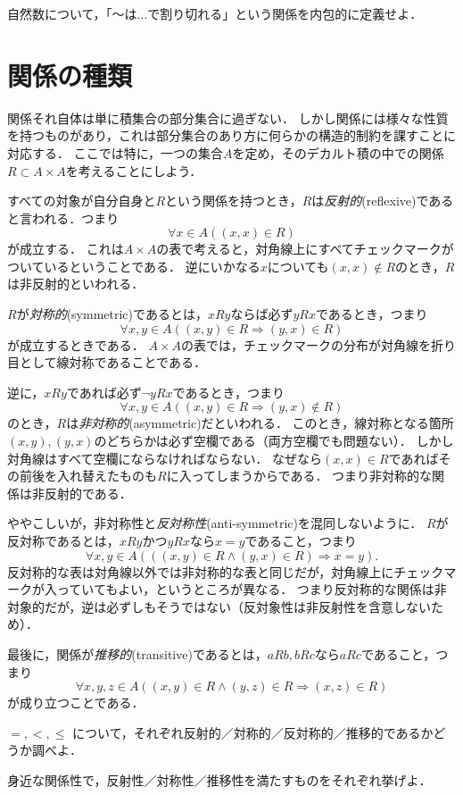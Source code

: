 \documentclass[11pt,a4paper]{jsarticle}
\begin{document}
\begin{exercise}
自然数について，「〜は...で割り切れる」という関係を内包的に定義せよ．
\end{exercise}


\section{関係の種類}
関係それ自体は単に積集合の部分集合に過ぎない．
しかし関係には様々な性質を持つものがあり，これは部分集合のあり方に何らかの構造的制約を課すことに対応する．
ここでは特に，一つの集合$A$を定め，そのデカルト積の中での関係$R \subset A \times A$を考えることにしよう．

すべての対象が自分自身と$R$という関係を持つとき，$R$は\emph{反射的}(reflexive)であると言われる．つまり
\[
 \forall x \in A ( (x,x) \in R )
\]
が成立する．
これは$A \times A$の表で考えると，対角線上にすべてチェックマークがついているということである．
逆にいかなる$x$についても$(x, x) \not\in R$のとき，$R$は非反射的といわれる．

$R$が\emph{対称的}(symmetric)であるとは，$xRy$ならば必ず$yRx$であるとき，つまり
\[
 \forall x, y \in A ( (x,y) \in R \Rightarrow (y,x) \in R)
\]
が成立するときである．
$A \times A$の表では，チェックマークの分布が対角線を折り目として線対称であることである．

逆に，$xRy$であれば必ず$\neg yRx$であるとき，つまり
\[
 \forall x, y \in A ( (x,y) \in R \Rightarrow (y,x) \not\in R)
\]
のとき，$R$は\emph{非対称的}(asymmetric)だといわれる．
このとき，線対称となる箇所$(x,y), (y,x)$のどちらかは必ず空欄である（両方空欄でも問題ない）．
しかし対角線はすべて空欄にならなければならない．
なぜなら$(x,x) \in R$であればその前後を入れ替えたものも$R$に入ってしまうからである．
つまり非対称的な関係は非反射的である．

ややこしいが，非対称性と\emph{反対称性}(anti-symmetric)を混同しないように．
$R$が反対称であるとは，$xRy$かつ$yRx$なら$x=y$であること，つまり
\[
 \forall x, y \in A ( ((x,y) \in R \wedge  (y,x) \in R) \Rightarrow x=y).
\]
反対称的な表は対角線以外では非対称的な表と同じだが，対角線上にチェックマークが入っていてもよい，というところが異なる．
つまり反対称的な関係は非対象的だが，逆は必ずしもそうではない（反対象性は非反射性を含意しないため）．

最後に，関係が\emph{推移的}(transitive)であるとは，$aRb, bRc$なら$aRc$であること，つまり
\[
 \forall x, y, z \in A ((x,y) \in R \wedge (y,z) \in R \Rightarrow (x,z) \in R)
\]
が成り立つことである．

\begin{exercise}
 $=, <, \leq$ について，それぞれ反射的／対称的／反対称的／推移的であるかどうか調べよ．
\end{exercise}

\begin{exercise}
 身近な関係性で，反射性／対称性／推移性を満たすものをそれぞれ挙げよ．
\end{exercise}
\end{document}
